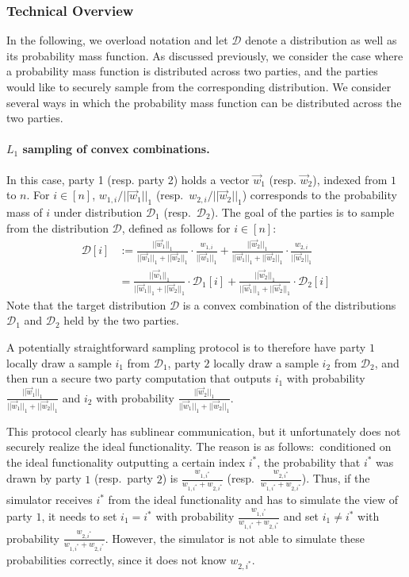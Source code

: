 \subsubsection{Technical Overview}

In the following, we overload notation and let $\mathcal{D}$ denote a
distribution as well as its probability mass function.  As discussed
previously, we consider the case where a probability mass function is
distributed across two parties, and the parties would like to securely
sample from the corresponding distribution.  We consider several ways in
which the probability mass function can be distributed across the two
parties.

\paragraph{$L_1$ sampling of convex combinations.}
In this case, party 1 (resp. party 2) holds a vector $\vec{w}_1$ (resp.
$\vec{w}_2$), indexed from $1$ to $n$. For $i \in [n]$,
$w_{1,i}/||\vec{w}_1||_1$ (resp.~$w_{2,i}/||\vec{w}_2||_1$) corresponds
to the probability mass of $i$ under distribution $\mathcal{D}_1$
(resp.~$\mathcal{D}_2$).  The goal of the parties is to sample from the
distribution $\mathcal{D}$, defined as follows for $i \in [n]$:
%
\begin{align*}
\mathcal{D}[i] &:= \frac{||\vec{w}_1||_1}{||\vec{w}_1||_1 + ||\vec{w}_2||_1} \cdot \frac{w_{1,i}}{||\vec{w}_1||_1} + \frac{||\vec{w}_2||_1}{||\vec{w}_1||_1 + ||\vec{w}_2||_1} \cdot \frac{w_{2,i}}{||\vec{w}_2||_1}\\
&= \frac{||\vec{w}_1||_1}{||\vec{w}_1||_1 + ||\vec{w}_2||_1} \cdot \mathcal{D}_1[i] + \frac{||\vec{w}_2||_1}{||\vec{w}_1||_1 + ||\vec{w}_2||_1} \cdot \mathcal{D}_2[i]
\end{align*}
%
Note that the target distribution $\mathcal{D}$ is a convex combination
of the distributions $\mathcal{D}_1$ and $\mathcal{D}_2$ held by the two
parties.

A potentially straightforward sampling protocol is to therefore have
party $1$ locally draw a sample $i_1$ from $\mathcal{D}_1$, party $2$
locally draw a sample $i_2$ from $\mathcal{D}_2$, and then run a secure
two party computation that outputs $i_1$ with probability
$\frac{||\vec{w}_1||_1}{||\vec{w}_1||_1 + ||\vec{w}_2||_1}$ and $i_2$
with probability $\frac{||\vec{w}_2||_1}{||\vec{w}_1||_1 +
||\vec{w}_2||_1}$.

This protocol clearly has sublinear communication, but it unfortunately does not
securely realize the ideal functionality.  The reason is as
follows:~conditioned on the ideal functionality outputting a certain
index $i^*$, the probability that $i^*$ was drawn by party $1$
(resp.~party $2$) is $\frac{w_{1,i^*}}{w_{1,i^*} + w_{2,i^*}}$
(resp.~$\frac{w_{2,i^*}}{w_{1,i^*} + w_{2,i^*}}$).  
%
Thus, if the simulator receives $i^*$ from the ideal functionality and
has to simulate the view of party $1$, it needs to set $i_1 = i^*$ with
probability $\frac{w_{1,i^*}}{w_{1,i^*} + w_{2,i^*}}$ and set $i_1 \neq
i^*$ with probability $\frac{w_{2,i^*}}{w_{1,i^*} + w_{2,i^*}}$.
However, the simulator is not able to simulate these probabilities
correctly, since it does not know $w_{2,i^*}$.

